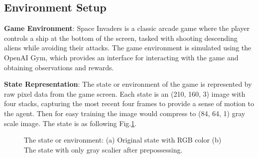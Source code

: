 \documentclass[preprint,12pt,3p,times]{elsarticle}
\begin{document}
\subsection{Environment Setup}
\textbf{Game Environment}: Space Invaders is a classic arcade game where the player controls a ship at the bottom of the screen, tasked with shooting descending aliens while avoiding their attacks. The game environment is simulated using the OpenAI Gym, which provides an interface for interacting with the game and obtaining observations and rewards.

\textbf{State Representation}: The state or environment of the game is represented by raw pixel data from the game screen. Each state is an (210, 160, 3) image with four stacks, capturing the most recent four frames to provide a sense of motion to the agent. Then for easy training the image would compress to (84, 64, 1) gray scale image. The state is as following Fig.\ref{figlabel1}.

\begin{figure}[!t]
\centering
{}
\caption{\label{figlabel1} The state or environment: (a) Original state with RGB color (b) The state with only gray scalier after prepossessing.}
\end{figure}
\end{document}
